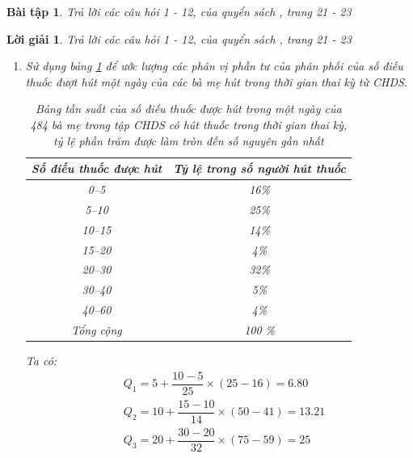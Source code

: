 \documentclass[14pt, a4paper]{article}
\theoremstyle{sltheorem}
\newtheorem{baitap}{Bài tập}
\theoremstyle{soltheorem}
\newtheorem*{loigiai}{Lời giải}
\begin{document}
\begin{baitap}
    Trả lời các câu hỏi 1 - 12, của quyển sách \cite{nolan2001stat}, trang 21 - 23
\end{baitap}

\begin{loigiai}
    Trả lời các câu hỏi 1 - 12, của quyển sách \cite{nolan2001stat}, trang 21 - 23
    \begin{enumerate}[wide, labelwidth=!, labelindent=0pt,label=\textbf{\arabic*}.]
        \item Sử dụng bảng \ref{tb:1.3} để ước lượng các phân vị phần tư của phân phối của số điếu thuốc đượt hút một ngày của các bà mẹ hút trong thời gian thai kỳ từ CHDS.

            \begin{table}[h!]
                \begin{center}
                    \begin{tabular}{|c|c|}
                        \hline
                        \textbf{Số điếu thuốc được hút} & \textbf{Tỷ lệ trong số người hút thuốc} \\  
                        \hline
                        0--5 & 16\% \\  
                        5--10 & 25\% \\  
                        10--15 & 14\% \\  
                        15--20 & 4\% \\  
                        20--30 & 32\% \\  
                        30--40 & 5\% \\  
                        40--60 & 4\% \\  
                        \hline
                        Tổng cộng & 100 \% \\
                        \hline
                    \end{tabular}
                \end{center}
                \caption{Bảng tần suất của số điếu thuốc được hút trong một ngày của 484 bà mẹ trong tập CHDS có hút thuốc trong thời gian thai kỳ,
                tỷ lệ phần trăm được làm tròn đến số nguyên gần nhất}
                \label{tb:1.3}
            \end{table}
        
        Ta có:
        \begin{equation*}
            \begin{aligned}
                &Q_1 = 5 + \dfrac{10 - 5}{25} \times (25 - 16) = 6.80 \\
                &Q_2 = 10 + \dfrac{15 - 10}{14} \times (50 - 41) = 13.21 \\
                &Q_3 = 20 + \dfrac{30 - 20}{32} \times (75 - 59) = 25
            \end{aligned}
        \end{equation*}


\end{enumerate}
\end{loigiai}
\end{document}
